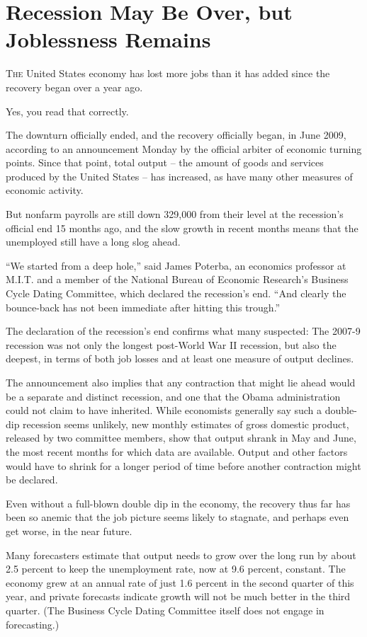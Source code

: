 ﻿\documentclass[12pt]{article}
\begin{document}
\pagebreak
\section{Recession May Be Over, but Joblessness Remains}

\lettrine{T}{he} United States economy has lost more jobs than it has added
since the recovery began over a year ago.

Yes, you read that correctly.

The downturn officially ended, and the recovery officially began, in June 2009, according to an
announcement Monday by the official arbiter of economic turning points. Since that point, total
output -- the amount of goods and services produced by the United States -- has increased, as have
many other measures of economic activity.

But nonfarm payrolls are still down 329,000 from their level at the recession's official end 15
months ago, and the slow growth in recent months means that the unemployed still have a long slog
ahead.

``We started from a deep hole,'' said James Poterba, an economics professor at M.I.T. and a member
of the National Bureau of Economic Research's Business Cycle Dating Committee, which declared the
recession's end. ``And clearly the bounce-back has not been immediate after hitting this trough.''

The declaration of the recession's end confirms what many suspected: The 2007-9 recession was not
only the longest post-World War II recession, but also the deepest, in terms of both job losses and
at least one measure of output declines.

The announcement also implies that any contraction that might lie ahead would be a separate and
distinct recession, and one that the Obama administration could not claim to have inherited. While
economists generally say such a double-dip recession seems unlikely, new monthly estimates of gross
domestic product, released by two committee members, show that output shrank in May and June, the
most recent months for which data are available. Output and other factors would have to shrink for a
longer period of time before another contraction might be declared.

Even without a full-blown double dip in the economy, the recovery thus far has been so anemic that
the job picture seems likely to stagnate, and perhaps even get worse, in the near future.

Many forecasters estimate that output needs to grow over the long run by about 2.5 percent to keep
the unemployment rate, now at 9.6 percent, constant. The economy grew at an annual rate of just 1.6
percent in the second quarter of this year, and private forecasts indicate growth will not be much
better in the third quarter. (The Business Cycle Dating Committee itself does not engage in
forecasting.)
\end{document}
